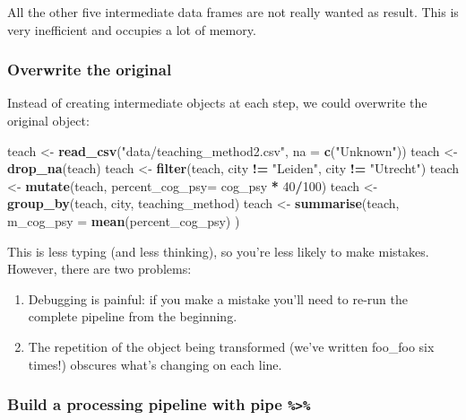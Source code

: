 \documentclass[
]{scrartcl}
\newenvironment{Shaded}{\begin{snugshade}}{\end{snugshade}}
\newcommand{\AttributeTok}[1]{\textcolor[rgb]{0.13,0.29,0.53}{#1}}
\newcommand{\DecValTok}[1]{\textcolor[rgb]{0.00,0.00,0.81}{#1}}
\newcommand{\FunctionTok}[1]{\textcolor[rgb]{0.13,0.29,0.53}{\textbf{#1}}}
\newcommand{\NormalTok}[1]{#1}
\newcommand{\OtherTok}[1]{\textcolor[rgb]{0.56,0.35,0.01}{#1}}
\newcommand{\SpecialCharTok}[1]{\textcolor[rgb]{0.81,0.36,0.00}{\textbf{#1}}}
\newcommand{\StringTok}[1]{\textcolor[rgb]{0.31,0.60,0.02}{#1}}
\providecommand{\tightlist}{%
  \setlength{\itemsep}{0pt}\setlength{\parskip}{0pt}}
\begin{document}
All the other five intermediate data frames are not really wanted as result. This is very inefficient and occupies a lot of memory.

\subsubsection{Overwrite the original}\label{overwrite-the-original}

Instead of creating intermediate objects at each step, we could overwrite the original object:

\begin{Shaded}
\begin{Highlighting}[]
\NormalTok{teach }\OtherTok{\textless{}{-}} \FunctionTok{read\_csv}\NormalTok{(}\StringTok{"data/teaching\_method2.csv"}\NormalTok{, }\AttributeTok{na =} \FunctionTok{c}\NormalTok{(}\StringTok{"Unknown"}\NormalTok{))}
\NormalTok{teach }\OtherTok{\textless{}{-}} \FunctionTok{drop\_na}\NormalTok{(teach)}
\NormalTok{teach }\OtherTok{\textless{}{-}} \FunctionTok{filter}\NormalTok{(teach, city }\SpecialCharTok{!=} \StringTok{"Leiden"}\NormalTok{, city }\SpecialCharTok{!=} \StringTok{"Utrecht"}\NormalTok{)}
\NormalTok{teach }\OtherTok{\textless{}{-}} \FunctionTok{mutate}\NormalTok{(teach, }\AttributeTok{percent\_cog\_psy=}\NormalTok{ cog\_psy }\SpecialCharTok{*} \DecValTok{40}\SpecialCharTok{/}\DecValTok{100}\NormalTok{)}
\NormalTok{teach }\OtherTok{\textless{}{-}} \FunctionTok{group\_by}\NormalTok{(teach, city, teaching\_method)}
\NormalTok{teach }\OtherTok{\textless{}{-}} \FunctionTok{summarise}\NormalTok{(teach, }\AttributeTok{m\_cog\_psy =} \FunctionTok{mean}\NormalTok{(percent\_cog\_psy) )}
\end{Highlighting}
\end{Shaded}

This is less typing (and less thinking), so you're less likely to make mistakes. However, there are two problems:

\begin{enumerate}
\def\labelenumi{\arabic{enumi}.}
\tightlist
\item
  Debugging is painful: if you make a mistake you'll need to re-run the complete pipeline from the beginning.
\item
  The repetition of the object being transformed (we've written foo\_foo six times!) obscures what's changing on each line.
\end{enumerate}

\subsubsection{\texorpdfstring{Build a processing pipeline with pipe \texttt{\%\textgreater{}\%}}{Build a processing pipeline with pipe \%\textgreater\%}}\label{build-a-processing-pipeline-with-pipe}
\end{document}
